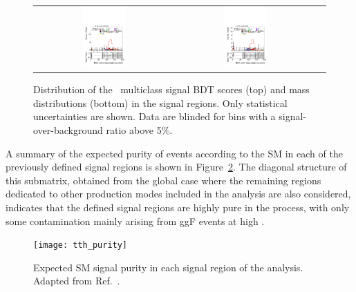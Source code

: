 \begin{figure}[htbp]
\begin{tabular}{ccc}
        \includegraphics[width=0.32\textwidth]{images/sr_cr_plots/plot_ditau_mmc_mlm_m_hh_tth_sr_pth_200_300.pdf} &
        \includegraphics[width=0.32\textwidth]{images/sr_cr_plots/plot_ditau_mmc_mlm_m_hh_tth_sr_pth_gt300.pdf} \\
      \end{tabular}
      
      \caption{Distribution of the \ttH\ multiclass signal BDT scores (top) and mass distributions (bottom) 
      in the signal regions. Only statistical uncertainties are shown. Data are blinded for bins with a 
      signal-over-background ratio above 5\%.}
      \label{fig:bdt_signal}
    \end{figure}

A summary of the expected purity of \ttHtt events according to the SM in each of the previously defined signal regions is shown in Figure~\ref{fig:tth_purity}. The diagonal structure of this submatrix, obtained from the global case where the remaining regions dedicated to other production modes included in the \htautau analysis are also considered, indicates that the defined signal regions are highly pure in the \ttH process, with only some contamination mainly arising from ggF events at high \pth.

\begin{figure}[htbp]
  \centering
  \texttt{[image: tth\_purity]}
  \caption{Expected SM \ttHtt signal purity in each signal region of the analysis. Adapted from Ref.~\cite{differential_htautau}.}
  \label{fig:tth_purity}
\end{figure}

